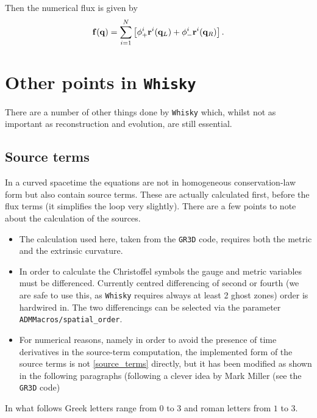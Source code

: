 \documentclass{article}
\begin{document}
Then the numerical flux is given by
\begin{equation}
  \label{marqflux}
  {\bf f}({\bf q}) = \sum_{i=1}^N \left[ {\bf \phi}^i_+ 
  {\bf r}^i ({\bf q}_L) + {\bf \phi}^i_- {\bf r}^i ({\bf q}_R)
  \right].
\end{equation}

\section{Other points in {\tt Whisky}}
\label{sec:misc}

There are a number of other things done by {\tt Whisky} which, whilst not as
important as reconstruction and evolution, are still essential.


\subsection{Source terms}
\label{sec:sources}

In a curved spacetime the equations are not in homogeneous conservation-law 
form but also contain source terms. These are actually calculated
first, before the flux terms (it simplifies the loop very slightly).
There are a few points to note about the calculation of the sources.
\begin{itemize}
\item The calculation used here, taken from the {\tt GR3D} code, requires both the
  metric and the extrinsic curvature.
\item In order to calculate the Christoffel symbols the gauge and
  metric variables must be differenced. Currently centred differencing
  of second or fourth (we are safe to use this, as {\tt Whisky} requires 
  always at least 2 ghost zones) order is hardwired in. The two differencings can be selected via
  the parameter {\tt ADMMacros/spatial\_order}.
\item For numerical reasons, namely in order to avoid the presence of time derivatives
  in the source-term computation, the implemented form of the source terms is not
  \eqref{source_terms} directly, but it has been modified as shown in
  the following paragraphs (following a clever idea by Mark Miller (see the {\tt GR3D} code) 
\end{itemize}

In what follows Greek letters range from $0$ to $3$ and roman letters from $1$ to $3$.
\end{document}

